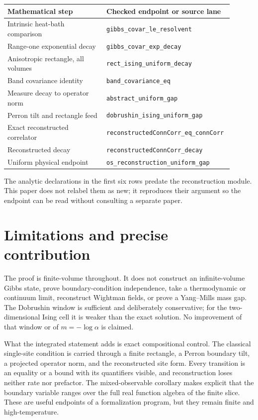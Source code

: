 \documentclass[11pt]{article}
\theoremstyle{definition}
\theoremstyle{remark}
\newcommand{\lean}[1]{\nolinkurl{#1}}
\begin{document}
\begin{center}\small
\begin{tabular}{p{0.43\linewidth}p{0.47\linewidth}}
\toprule
Mathematical step & Checked endpoint or source lane\\
\midrule
Intrinsic heat-bath comparison & \lean{gibbs\_covar\_le\_resolvent}\\
Range-one exponential decay & \lean{gibbs\_covar\_exp\_decay}\\
Anisotropic rectangle, all volumes & \lean{rect\_ising\_uniform\_decay}\\
Band covariance identity & \lean{band\_covariance\_eq}\\
Measure decay to operator norm & \lean{abstract\_uniform\_gap}\\
Perron tilt and rectangle feed & \lean{dobrushin\_ising\_uniform\_gap}\\
Exact reconstructed correlator & \lean{reconstructedConnCorr\_eq\_connCorr}\\
Reconstructed decay & \lean{reconstructedConnCorr\_decay}\\
Uniform physical endpoint & \lean{os\_reconstruction\_uniform\_gap}\\
\bottomrule
\end{tabular}
\end{center}

The analytic declarations in the first six rows predate the reconstruction
module.  This paper does not relabel them as new; it reproduces their argument
so the endpoint can be read without consulting a separate paper.

\section{Limitations and precise contribution}

The proof is finite-volume throughout.  It does not construct an
infinite-volume Gibbs state, prove boundary-condition independence, take a
thermodynamic or continuum limit, reconstruct Wightman fields, or prove a
Yang--Mills mass gap.  The Dobrushin window is sufficient and deliberately
conservative; for the two-dimensional Ising cell it is weaker than the exact
solution.  No improvement of that window or of $m=-\log\alpha$ is claimed.

What the integrated statement adds is exact compositional control.  The
classical single-site condition is carried through a finite rectangle, a
Perron boundary tilt, a projected operator norm, and the reconstructed site
form.  Every transition is an equality or a bound with its quantifiers visible,
and reconstruction loses neither rate nor prefactor.  The mixed-observable
corollary makes explicit that the boundary variable ranges over the full real
function algebra of the finite slice.  These are useful endpoints of a
formalization program, but they remain finite and high-temperature.
\end{document}
